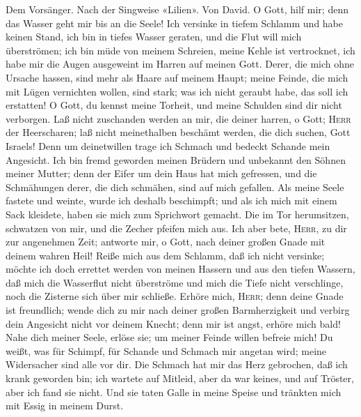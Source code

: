  Dem Vorsänger. Nach der Singweise «Lilien». Von David. O
Gott, hilf mir; denn das Wasser geht mir bis an die Seele!
 Ich versinke in tiefem Schlamm und habe keinen Stand, ich
bin in tiefes Wasser geraten, und die Flut will mich überströmen;
 ich bin müde von meinem Schreien, meine Kehle ist
vertrocknet, ich habe mir die Augen ausgeweint im Harren auf meinen
Gott.  Derer, die mich ohne Ursache hassen, sind mehr als
Haare auf meinem Haupt; meine Feinde, die mich mit Lügen vernichten
wollen, sind stark; was ich nicht geraubt habe, das soll ich erstatten!
 O Gott, du kennst meine Torheit, und meine Schulden sind
dir nicht verborgen.  Laß nicht zuschanden werden an mir,
die deiner harren, o Gott; \textsc{Herr} der Heerscharen; laß nicht
meinethalben beschämt werden, die dich suchen, Gott Israels!
 Denn um deinetwillen trage ich Schmach und bedeckt
Schande mein Angesicht.  Ich bin fremd geworden meinen
Brüdern und unbekannt den Söhnen meiner Mutter;  denn der
Eifer um dein Haus hat mich gefressen, und die Schmähungen derer, die
dich schmähen, sind auf mich gefallen.  Als meine Seele
fastete und weinte, wurde ich deshalb beschimpft;  und
als ich mich mit einem Sack kleidete, haben sie mich zum Sprichwort
gemacht.  Die im Tor herumsitzen, schwatzen von mir, und
die Zecher pfeifen mich aus.  Ich aber bete,
\textsc{Herr}, zu dir zur angenehmen Zeit; antworte mir, o Gott, nach
deiner großen Gnade mit deinem wahren Heil!  Reiße mich
aus dem Schlamm, daß ich nicht versinke; möchte ich doch errettet werden
von meinen Hassern und aus den tiefen Wassern,  daß mich
die Wasserflut nicht überströme und mich die Tiefe nicht verschlinge,
noch die Zisterne sich über mir schließe.  Erhöre mich,
\textsc{Herr}; denn deine Gnade ist freundlich; wende dich zu mir nach
deiner großen Barmherzigkeit  und verbirg dein Angesicht
nicht vor deinem Knecht; denn mir ist angst, erhöre mich bald!
 Nahe dich meiner Seele, erlöse sie; um meiner Feinde
willen befreie mich!  Du weißt, was für Schimpf, für
Schande und Schmach mir angetan wird; meine Widersacher sind alle vor
dir.  Die Schmach hat mir das Herz gebrochen, daß ich
krank geworden bin; ich wartete auf Mitleid, aber da war keines, und auf
Tröster, aber ich fand sie nicht.  Und sie taten Galle in
meine Speise und tränkten mich mit Essig in meinem Durst.
